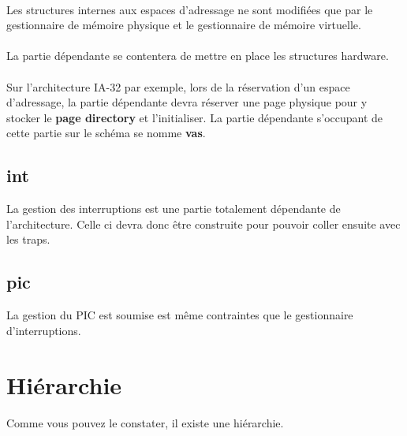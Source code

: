 \documentclass[10pt,a4wide]{article}
\begin{document}
\paragraph{}

Les structures internes aux espaces d'adressage ne sont modifi\'ees que
par le gestionnaire de m\'emoire physique et le gestionnaire de m\'emoire
virtuelle.

\paragraph{}

La partie d\'ependante se contentera de mettre en place les structures
hardware.

\paragraph{}

Sur l'architecture IA-32 par exemple, lors de la r\'eservation
d'un espace d'adressage, la partie d\'ependante devra r\'eserver une page
physique pour y stocker le \textbf{page directory} et l'initialiser. La
partie d\'ependante s'occupant de cette partie sur le sch\'ema se nomme
\textbf{vas}.

\subsection{int}

La gestion des interruptions est une partie totalement d\'ependante de
l'architecture. Celle ci devra donc \^etre construite pour pouvoir
coller ensuite avec les traps.

\subsection{pic}

La gestion du PIC est soumise est m\^eme contraintes que le gestionnaire
d'interruptions.

\section{Hi\'erarchie}

\paragraph{}

Comme vous pouvez le constater, il existe une hi\'erarchie.
\end{document}
